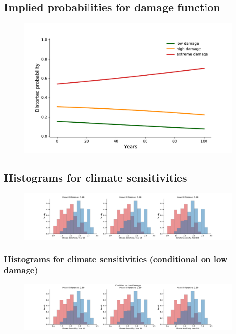 \documentclass[11pt]{article}
\begin{document}
\subsection{Implied probabilities for damage function}
\begin{figure}[H]
		\center
		\includegraphics[height=.35\textheight]{damage_probability.pdf}
\end{figure}

\subsection{Histograms for climate sensitivities}
\begin{figure}[H]
		\center
		\includegraphics[height=.2\textheight]{climate_histogram.pdf}
\end{figure}

\subsubsection{Histograms for climate sensitivities (conditional on low damage)}

\begin{figure}[H]
		\center
		\includegraphics[height=.2\textheight]{climate_histogram_low_damage.pdf}
\end{figure}
\end{document}
